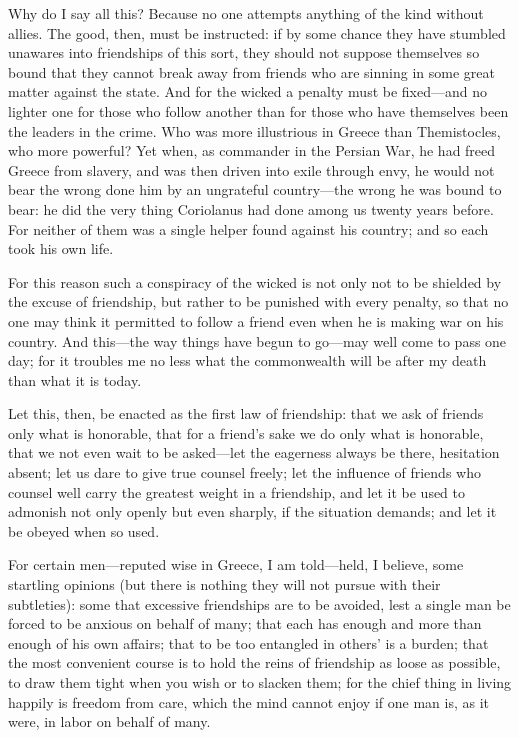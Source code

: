  Why do I say all this? Because no one attempts anything of the kind without allies. The good, then, must be instructed: if by some chance they have stumbled unawares into friendships of this sort, they should not suppose themselves so bound that they cannot break away from friends who are sinning in some great matter against the state. And for the wicked a penalty must be fixed—and no lighter one for those who follow another than for those who have themselves been the leaders in the crime. Who was more illustrious in Greece than Themistocles, who more powerful? Yet when, as commander in the Persian War, he had freed Greece from slavery, and was then driven into exile through envy, he would not bear the wrong done him by an ungrateful country—the wrong he was bound to bear: he did the very thing Coriolanus had done among us twenty years before. For neither of them was a single helper found against his country; and so each took his own life.

 For this reason such a conspiracy of the wicked is not only not to be shielded by the excuse of friendship, but rather to be punished with every penalty, so that no one may think it permitted to follow a friend even when he is making war on his country. And this—the way things have begun to go—may well come to pass one day; for it troubles me no less what the commonwealth will be after my death than what it is today.

 Let this, then, be enacted as the first law of friendship: that we ask of friends only what is honorable, that for a friend's sake we do only what is honorable, that we not even wait to be asked—let the eagerness always be there, hesitation absent; let us dare to give true counsel freely; let the influence of friends who counsel well carry the greatest weight in a friendship, and let it be used to admonish not only openly but even sharply, if the situation demands; and let it be obeyed when so used.

 For certain men—reputed wise in Greece, I am told—held, I believe, some startling opinions (but there is nothing they will not pursue with their subtleties): some that excessive friendships are to be avoided, lest a single man be forced to be anxious on behalf of many; that each has enough and more than enough of his own affairs; that to be too entangled in others' is a burden; that the most convenient course is to hold the reins of friendship as loose as possible, to draw them tight when you wish or to slacken them; for the chief thing in living happily is freedom from care, which the mind cannot enjoy if one man is, as it were, in labor on behalf of many.

